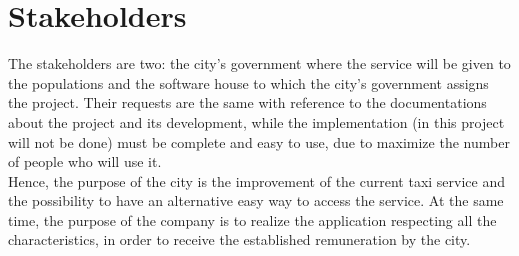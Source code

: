 \section{Stakeholders}
The stakeholders are two: the city's government where the service will be given to the populations and the software house to which the city's government assigns the project. Their requests are the same with reference to the documentations about the project and its development, while the implementation (in this project will not be done) must be complete and easy to use, due to maximize the number of people who will use it.\\
Hence, the purpose of the city is the improvement of the current taxi service and the possibility to have an alternative easy way to access the service. At the same time, the purpose of the company is to realize the application respecting all the characteristics, in order to receive the established remuneration by the city.

\glsaddall
\printglossaries

